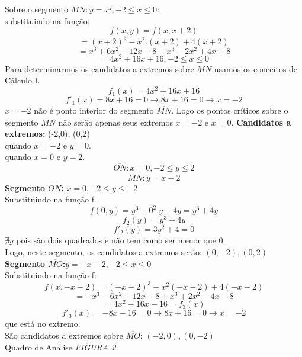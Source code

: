 \documentclass{article}
\begin{document}
		Sobre o segmento $\overline{MN}: y=x², -2 \leq x \leq 0$:\\
		substituindo na função:
		$$f(x,y) = f(x,x+2)$$
		$$= (x+2)^3-x^2.(x+2)+4(x+2)$$
		$$= x^3+6x^2+12x+8-x^3-2x^2+4x+8$$%
		$$=4x^2+16x+16, -2\leq x \leq 0$$%
		Para determinarmos os candidatos a extremos sobre $\overline{MN}$ usamos os conceitos de Cálculo I.
		$$f_1(x)=4x^2+16x+16$$
		$$f'_1(x)=8x+16=0 \to 8x+16=0 \to x=-2$$
		$x=-2$ não é ponto interior do segmento $\overline{MN}$. Logo os pontos críticos sobre o segmento $\overline{MN}$ não serão apenas seus extremos $x=-2$ e $x=0$.
		\textbf{Candidatos a extremos:} (-2,0), (0,2)\\
		quando $x= -2$ e $y=0$.\\
		quando $x=0$ e $y=2$.\\
		$$\overline{ON}: x=0, -2 \leq y \leq 2$$
		$$\overline{MN}: y= x+2$$
		\textbf{Segmento $\overline{ON}$:} $x=0, -2 \leq y \leq -2$\\
		Substituindo na função f.
		$$f(0,y) = y^3-0^2.y+4y = y^3+4y$$
		$$f_2(y) = y^3+4y$$
		$$f'_2(y) = 3y^2 +4 = 0 $$
		$\nexists y$ pois são dois quadrados e não tem como ser menor que 0.\\
		Logo, neste segmento, os candidatos a extremos serão: $(0,-2), (0,2)$
		\textbf{Segmento $\overline{MO}$:}$y=-x-2,-2 \leq x \leq 0$ \\
		Substituindo na função f:\\
		$$f(x,-x-2)=(-x-2)^3-x^2(-x-2)+4(-x-2)$$
		$$=-x^3-6x^2-12x-8+x^3+2x^2-4x-8$$
		$$=4x^2-16x-16 = f_3(x)$$
		$$f'_3(x)=-8x-16=0 \to 8x+16 = 0 \to x=-2$$
		que está no extremo.\\
		São candidatos a extremos sobre $\overline{MO}$: $(-2,0),(0,-2)$\\
		Quadro de Análise \textit{FIGURA 2}\\
		
\end{document}
